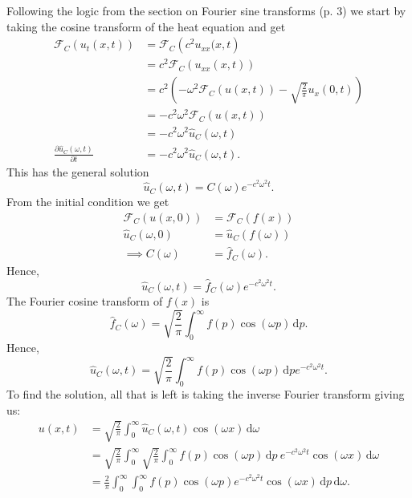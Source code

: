 \begin{derivation}
  Following the logic from the section on Fourier sine transforms (p. 3) we start by taking the cosine transform of the heat equation and get
  \begin{align*}
    \mathcal{F}_C (u_t(x,t)) &= \mathcal{F}_C \left( c^2 u_{x x}(x,t \right) \\
    &= c^2 \mathcal{F}_C \left( u_{x x }(x,t) \right) \\
    &= c^2 \left( - \omega^2 \mathcal{F}_C(u(x,t)) - \sqrt{\frac{2}{\pi}} u_x(0,t) \right) \\
    &= - c^2 \omega^2 \mathcal{F}_C(u(x,t)) \\
    &= -c^2 \omega^2 \hat{u}_C(\omega, t) \\
    \frac{\partial \hat{u}_C(\omega,t)}{\partial t} &= -c^2 \omega^2 \hat{u}_C(\omega,t)
  .\end{align*}
  This has the general solution
  \begin{equation*}
    \hat{u}_C(\omega, t) = C(\omega) e^{-c^2\omega^2 t}
  .\end{equation*}
  From the initial condition we get
  \begin{align*}
    \mathcal{F}_C(u(x,0)) &= \mathcal{F}_C(f(x)) \\
    \hat{u}_C(\omega, 0) &= \hat{u}_C(f(\omega)) \\
    \implies C(\omega) &= \hat{f}_C(\omega)
  .\end{align*}
  Hence,
  \begin{equation*}
    \hat{u}_C(\omega, t) = \hat{f}_C(\omega) e^{-c^2 \omega^2 t}
  .\end{equation*}
  The Fourier cosine transform of $f(x)$ is
  \begin{equation*}
    \hat{f}_C (\omega) = \sqrt{\frac{2}{\pi}} \int_{0}^{\infty} f(p) \cos(\omega p) \, \mathrm{d}p
  .\end{equation*}
  Hence,
  \begin{equation*}
    \hat{u}_C(\omega, t) = \sqrt{\frac{2}{\pi}} \int_{0}^{\infty} f(p) \cos(\omega p) \, \mathrm{d}p e^{-c^2 \omega^2 t}
  .\end{equation*}
  To find the solution, all that is left is taking the inverse Fourier transform giving us:
  \begin{align*}
    u(x,t) &= \sqrt{\frac{2}{\pi}} \int_{0}^{\infty} \hat{u}_C(\omega, t) \cos (\omega x) \, \mathrm{d}\omega \\
    &= \sqrt{\frac{2}{\pi}} \int_{0}^{\infty} \sqrt{\frac{2}{\pi}} \int_{0}^{\infty} f(p) \cos (\omega p) \, \mathrm{d}p \: e^{-c^2 \omega^2 t} \cos (\omega x) \, \mathrm{d}\omega \\
    &= \frac{2}{\pi} \int_{0}^{\infty} \int_{0}^{\infty} f(p) \cos (\omega p) e^{-c^2 \omega^2 t} \cos (\omega x) \, \mathrm{d}p \, \mathrm{d}\omega
  .\end{align*}
\end{derivation}

